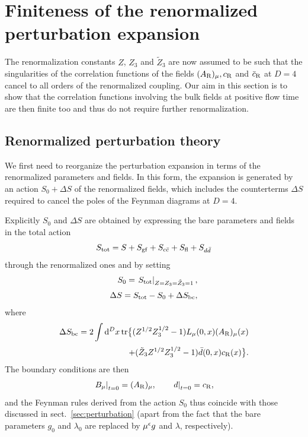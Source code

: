 \section{Finiteness of the renormalized perturbation expansion}\label{sec:fin}

The renormalization constants
$Z$, $Z_3$ and $\tilde{Z}_3$ are now assumed to be such
that the singularities of the
correlation functions of the fields $(A_{\mathrm{R}})_{\mu},c_{\mathrm{R}}$
and $\bar{c}_{\mathrm{R}}$ at $D=4$
cancel to all orders of the renormalized coupling.
Our aim in this section is to show that
the correlation functions involving the bulk fields
at positive flow time are then finite too and thus
do not require further renormalization.

\subsection{Renormalized perturbation theory}

We first need to reorganize the perturbation expansion
in terms of the renormalized parameters and fields.
In this form,
the expansion is generated by an action $S_0+\Delta S$
of the renormalized fields,
which includes the counterterms $\Delta S$ required to
cancel the poles of the Feynman diagrams at $D=4$.

Explicitly $S_0$ and $\Delta S$ are obtained by
expressing the bare parameters and fields
in the total action
\begin{equation}
  S_{\mathrm{tot}}=S+S_{\mathrm{gf}}+S_{c\bar{c}}+S_{\mathrm{fl}}+S_{d\bar{d}}
  \label{eq:7.1}
\end{equation}
through the renormalized ones and by setting
\begin{align}
  S_0=\left.S_{\mathrm{tot}}\right|_{Z=Z_3=\tilde{Z}_3=1},
  \label{eq:7.2}\\[2.5pt]
  \Delta S=S_{\mathrm{tot}}-S_0+\Delta S_{\mathrm{bc}},
  \label{eq:7.3}
\end{align}
where
\begin{align}
   \Delta S_{\mathrm{bc}}=2\int\mathrm{d}^Dx\,\mathrm{tr}\bigl\{
   (Z^{1/2}Z_3^{1/2}-1)L_{\mu}(0,x)(A_{\mathrm{R}})_{\mu}(x)
   \notag\\[2pt]
   +
   (\tilde{Z}_3Z^{1/2}Z_3^{1/2}-1)\bar{d}(0,x)c_{\mathrm{R}}(x)\bigr\}.
   \label{eq:7.4}
\end{align}
The boundary conditions are then
\begin{equation}
  \left.B_{\mu}\right|_{t=0}=(A_{\mathrm{R}})_{\mu},
  \qquad
  \left.d\right|_{t=0}=c_{\mathrm{R}},
  \label{eq:7.5}
\end{equation}
and the Feynman rules derived from the action $S_0$
thus coincide with those discussed in sect.~\ref{sec:perturbation}
(apart from the fact that the bare parameters $g_0$ and $\lambda_0$
are replaced by $\mu^{\epsilon}g$ and $\lambda$, respectively).

